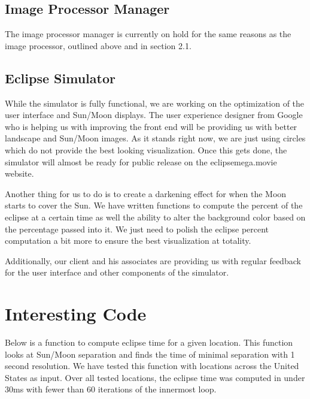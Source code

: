 \documentclass[10pt, onecolumn, draftclsnofoot, letterpaper, compsoc]{IEEEtran}
\begin{document}
\subsection{Image Processor Manager}

The image processor manager is currently on hold for the same reasons as the image
processor, outlined above and in section 2.1.

\subsection{Eclipse Simulator}

While the simulator is fully functional, we are working on the optimization
of the user interface and Sun/Moon displays. The user experience designer
from Google who is helping us with improving the front end will be providing
us with better landscape and Sun/Moon images. As it stands right now, we are
just using circles which do not provide the best looking visualization. Once this
gets done, the simulator will almost be ready for public release on the eclipsemega.movie
website.

Another thing for us to do is to create a darkening effect for when the Moon starts to
cover the Sun. We have written functions to compute the percent of the eclipse
at a certain time as well the ability to alter the background color based on
the percentage passed into it. We just need to polish the eclipse percent computation
a bit more to ensure the best visualization at totality.

Additionally, our client and his associates are providing us with regular feedback
for the user interface and other components of the simulator.


\section{Interesting Code}

Below is a function to compute eclipse time for a given location. This function looks at Sun/Moon
separation and finds the time of minimal separation with 1 second resolution. We have tested
this function with locations across the United States as input. Over all tested locations, the
eclipse time was computed in under 30ms with fewer than 60 iterations of the innermost loop. \\
\end{document}
